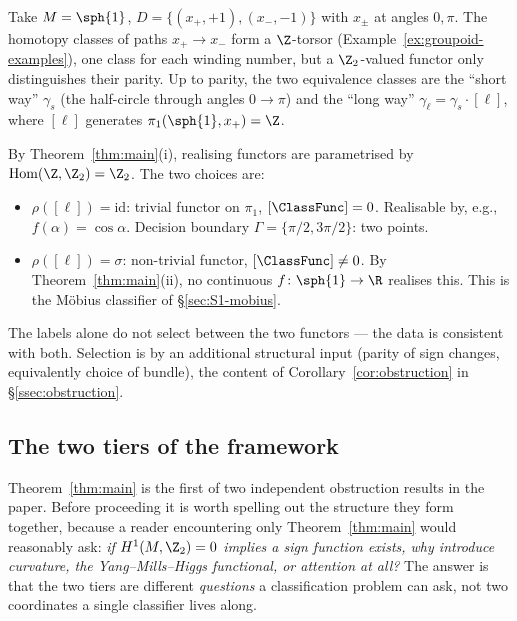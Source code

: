 \begin{example}\label{ex:mobius-thm-main}
Take $M=\sph{1}$, $D=\{(x_+,+1),(x_-,-1)\}$ with $x_\pm$ at angles
$0,\pi$. The homotopy classes of paths $x_+\to x_-$ form a $\Z$-torsor
(Example~\ref{ex:groupoid-examples}), one class for each winding
number, but a $\Z_2$-valued functor only distinguishes their parity.
Up to parity, the two equivalence classes are the ``short way''
$\gamma_s$ (the half-circle through angles $0\to\pi$) and the
``long way'' $\gamma_\ell=\gamma_s\cdot[\ell]$, where $[\ell]$
generates $\pi_1(\sph{1},x_+)=\Z$.

By Theorem~\ref{thm:main}(i), realising functors are parametrised by
$\mathrm{Hom}(\Z,\Z_2)=\Z_2$. The two choices are:
\begin{itemize}[leftmargin=2em]
\item $\rho([\ell])=\mathrm{id}$: trivial functor on $\pi_1$,
$[\ClassFunc]=0$. Realisable by, e.g., $f(\alpha)=\cos\alpha$.
Decision boundary $\Gamma=\{\pi/2,3\pi/2\}$: two points.
\item $\rho([\ell])=\sigma$: non-trivial functor,
$[\ClassFunc]\neq 0$. By Theorem~\ref{thm:main}(ii), no continuous
$f\colon\sph{1}\to\R$ realises this. This is the M\"obius classifier
of \S\ref{sec:S1-mobius}.
\end{itemize}
The labels alone do not select between the two functors --- the data
is consistent with both. Selection is by an additional structural
input (parity of sign changes, equivalently choice of bundle), the
content of Corollary~\ref{cor:obstruction} in \S\ref{ssec:obstruction}.
\end{example}

\subsection{The two tiers of the framework}\label{ssec:two-tiers}

Theorem~\ref{thm:main} is the first of two independent obstruction
results in the paper. Before proceeding it is worth spelling out the
structure they form together, because a reader encountering only
Theorem~\ref{thm:main} would reasonably ask: \emph{if $H^1(M,\Z_2)=0$
implies a sign function exists, why introduce curvature, the
Yang--Mills--Higgs functional, or attention at all?} The answer is
that the two tiers are different \emph{questions} a classification
problem can ask, not two coordinates a single classifier lives along.

